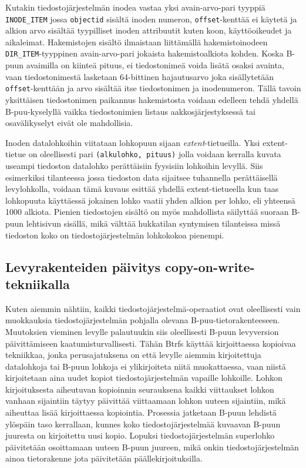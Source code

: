 Kutakin tiedostojärjestelmän inodea vastaa yksi avain-arvo-pari tyyppiä \texttt{INODE\_ITEM} jossa \texttt{objectid} sisältä inoden numeron, \texttt{offset}-kenttää ei käytetä ja alkion arvo sisältää tyypilliset inoden attribuutit kuten koon, käyttöoikeudet ja aikaleimat.
Hakemistojen sisältö ilmaistaan liittämällä hakemistoinodeen \texttt{DIR\_ITEM}-tyyppinen avain-arvo-pari jokaista hakemistoalkiota kohden.
Koska B-puun avaimilla on kiinteä pituus, ei tiedostonimeä voida lisätä osaksi avainta,
vaan tiedostonimestä lasketaan 64-bittinen hajautusarvo joka sisällytetään \texttt{offset}-kenttään ja arvo sisältää itse tiedostonimen ja inodenumeron.
Tällä tavoin yksittäisen tiedostonimen paikannus hakemistosta voidaan edelleen tehdä yhdellä B-puu-kyselyllä vaikka tiedostonimien listaus aakkosjärjestyksessä tai osavälikyselyt eivät ole mahdollisia.

Inoden datalohkoihin viitataan lohkopuun sijaan \emph{extent}-tietueilla.
Yksi extent-tietue on oleellisesti pari \texttt{(alkulohko, pituus)} jolla voidaan kerralla kuvata useampi tiedoston datalohko perättäisiin fyysisiin lohkoihin levyllä.
Siis esimerkiksi tilanteessa jossa tiedoston data sijaitsee tuhannella perättäisellä levylohkolla,
voidaan tämä kuvaus esittää yhdellä extent-tietueella kun taas lohkopuuta käyttäessä jokainen lohko vaatii yhden alkion per lohko, eli yhteensä 1000 alkiota.
Pienien tiedostojen sisältö on myös mahdollista säilyttää suoraan B-puun lehtisivun sisällä,
mikä välttää hukkatilan syntymisen tilanteissa missä tiedoston koko on tiedostojärjestelmän lohkokokoa pienempi.

\subsection{Levyrakenteiden päivitys copy-on-write-tekniikalla}
Kuten aiemmin nähtiin, kaikki tiedostojärjestelmä-operaatiot ovat oleellisesti vain muokkauksia tiedostojärjestelmän pohjalla olevana B-puu-tietorakenteeseen.
Muutoksien vieminen levylle palautuukin siis oleellisesti B-puun levyversion päivittämiseen kaatumisturvallisesti.
Tähän Btrfs käyttää kirjoittaessa kopioivaa tekniikkaa,
jonka perusajatuksena on että levylle aiemmin kirjoitettuja datalohkoja tai B-puun lohkoja ei ylikirjoiteta niitä muokattaessa,
vaan niistä kirjoitetaan aina uudet kopiot tiedostojärjestelmän vapaille lohkoille.
Lohkon kirjoituksesta aiheutuvan kopioinnin seurauksena kaikki viittaukset lohkon vanhaan sijaintiin täytyy päivittää viittaamaan lohkon uuteen sijaintiin,
mikä aiheuttaa lisää kirjoittaessa kopiointia.
Prosessia jatketaan B-puun lehdistä ylöspäin taso kerrallaan,
kunnes koko tiedostojärjestelmää kuvaavan B-puun juuresta on kirjoitettu uusi kopio.
Lopuksi tiedostojärjestelmän superlohko päivitetään osoittamaan uuteen B-puun juureen,
mikä onkin tiedostojärjestelmän ainoa tietorakenne jota päivitetään päällekirjoituksilla.

